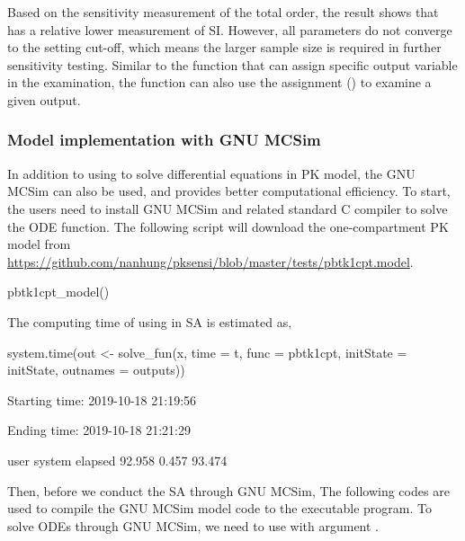 Based on the sensitivity measurement of the total order, the result
shows that  has a relative lower measurement of SI. However,
all parameters do not converge to the setting cut-off, which means the
larger sample size is required in further sensitivity testing. Similar
to the  function that can assign specific output variable in
the examination, the  function can also use the assignment
() to examine a given output.

\hypertarget{model-implementation-with-gnu-mcsim}{%
\subsubsection{Model implementation with GNU
MCSim}\label{model-implementation-with-gnu-mcsim}}

In addition to using  to solve differential equations
in PK model, the GNU MCSim can also be used, and provides better
computational efficiency. To start, the users need to install GNU MCSim
and related standard C compiler to solve the ODE function. The following
script will download the one-compartment PK model from
\url{https://github.com/nanhung/pksensi/blob/master/tests/pbtk1cpt.model}.

\begin{Schunk}
\begin{Sinput}
pbtk1cpt_model()
\end{Sinput}
\end{Schunk}

The computing time of using  in SA is estimated as,

\begin{Schunk}
\begin{Sinput}
system.time(out <- solve_fun(x, time = t, 
                             func = pbtk1cpt, initState = initState, 
                             outnames = outputs))
\end{Sinput}
\begin{Soutput}
  Starting time: 2019-10-18 21:19:56
\end{Soutput}
\begin{Soutput}
  Ending time: 2019-10-18 21:21:29
\end{Soutput}
\begin{Soutput}
     user  system elapsed 
   92.958   0.457  93.474
\end{Soutput}
\end{Schunk}

Then, before we conduct the SA through GNU MCSim, The following codes
are used to compile the GNU MCSim model code to the executable program.
To solve ODEs through GNU MCSim, we need to use 
with argument .

